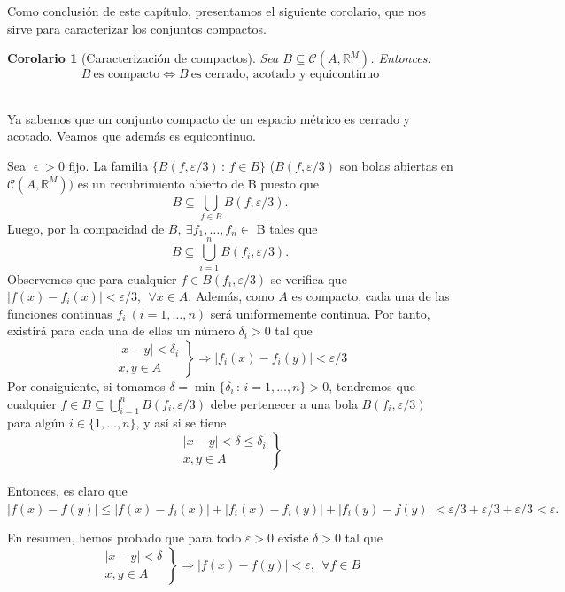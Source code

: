 \documentclass[11pt, a4paper]{article}
\makeatletter
\newif\IfInSansMode
\let\oldsf\sffamily
\renewcommand*{\sffamily}{\oldsf\mathversion{sans}\InSansModetrue}
\let\oldnorm\normalfont
\renewcommand*{\normalfont}{\oldnorm\InSansModefalse\mathversion{normal}}
\let\epsilon\upvarepsilon
\renewenvironment{proof}[1][\proofname] {\par\pushQED{\qed}\normalfont\topsep6\p@\@plus6\p@\relax\trivlist\item[\hskip\labelsep\itshape\sffamily#1\@addpunct{.}]\ignorespaces}{\popQED\endtrivlist\@endpefalse}
\theoremstyle{theorem-style}
\newtheorem{ncor}{Corolario}[section]
\theoremstyle{definition-style}
\theoremstyle{remark-style}
\theoremstyle{example-style}
\makeatother
\begin{document}
Como conclusión de este capítulo, presentamos el siguiente corolario, que nos sirve para caracterizar los conjuntos compactos.

\begin{ncor}[Caracterización de compactos] Sea $B \subseteq \mathcal{C}(A,\mathbb{R}^M)$. Entonces: $$B\ \text{es compacto} \iff B \ \text{es cerrado, acotado y equicontinuo}$$
\end{ncor}

  \begin{proof} \hfill \\
    \boxed{\Rightarrow} Ya sabemos que un conjunto compacto de un espacio métrico es cerrado y acotado. Veamos que además es equicontinuo.
    
    Sea $\epsilon >0$ fijo. La familia $\{ B(f, \varepsilon/3) \, : \, f\in B\}$ ($B(f, \varepsilon/3)$ son bolas abiertas en $\mathcal{C}(A, \mathbb{R}^M))$ es un recubrimiento abierto de B puesto que $$B\subseteq \bigcup_{f\in B} B(f, \varepsilon/3).$$
    Luego, por la compacidad de $B,\ \exists f_1, \dots, f_n \in$ B tales que $$B \subseteq \displaystyle \bigcup_{i=1}^n B(f_i, \varepsilon/3).$$
    Observemos que para cualquier $f\in B(f_i, \varepsilon/3)$ se verifica que
    $|f(x)-f_i(x)| < \varepsilon/3 , \ \ \forall x\in A$. Además, como $A$ es compacto, cada una de las funciones continuas $f_i \ (i=1,\dots,n)$ será uniformemente continua. Por tanto, existirá para cada una de ellas un número $\delta_i>0$ tal que $$\left. \begin{array}{c} |x-y|<\delta_i \\ x,y\in A \end{array}  \right\} \Rightarrow |f_i(x)-f_i(y)| <\varepsilon/3$$
    Por consiguiente, si tomamos $\delta = \min \{\delta_i \, :\, i=1,\dots,n\} >0$, tendremos que cualquier $f\in B \subseteq \bigcup_{i=1}^n B(f_i, \varepsilon/3)$ debe pertenecer a una bola $B(f_i, \varepsilon/3)$ para algún $i\in\{1,\dots ,n\}$, y así si se tiene $$\left. \begin{array}{c} |x-y|<\delta \leq \delta_i \\ x,y\in A \end{array}  \right\}$$ 

    Entonces, es claro que $\displaystyle |f(x)-f(y)| \le |f(x)-f_i(x)|+|f_i(x)-f_i(y)|+|f_i(y)-f(y)| < \varepsilon/3+\varepsilon/3+\varepsilon/3<\varepsilon.$

    En resumen, hemos probado que para todo $\varepsilon >0$ existe $\delta >0$ tal que $$ \left. \begin{array}{c} |x-y|<\delta  \\ x,y\in A \end{array}  \right\} \Rightarrow |f(x)-f(y)| <\varepsilon , \ \ \forall f\in B$$


\end{proof}
\end{document}
